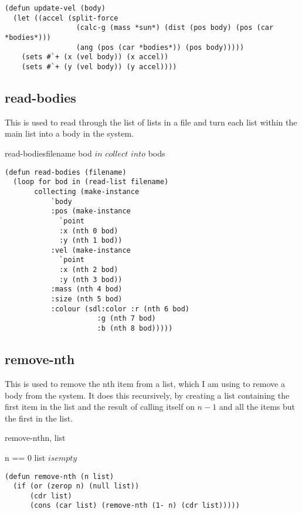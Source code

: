 \begin{lstlisting}
(defun update-vel (body)
  (let ((accel (split-force 
                 (calc-g (mass *sun*) (dist (pos body) (pos (car *bodies*)))
                 (ang (pos (car *bodies*)) (pos body)))))
    (sets #`+ (x (vel body)) (x accel))
    (sets #`+ (y (vel body)) (y accel))))
\end{lstlisting}

\subsection{read-bodies}
This is used to read through the list of lists in a file and turn each list
within the main list into a body in the system. \\
\begin{pseudocode}{read-bodies}{filename}
	\FOREACH bod $ in $ 
	\DO $collect $  $ into $ bods\\
\end{pseudocode}

\begin{lstlisting}
(defun read-bodies (filename)
  (loop for bod in (read-list filename)
       collecting (make-instance 
		   `body
		   :pos (make-instance
			 `point
			 :x (nth 0 bod)
			 :y (nth 1 bod))
		   :vel (make-instance
			 `point
			 :x (nth 2 bod)	
			 :y (nth 3 bod))
		   :mass (nth 4 bod)
		   :size (nth 5 bod)
		   :colour (sdl:color :r (nth 6 bod)
				      :g (nth 7 bod)
				      :b (nth 8 bod)))))
\end{lstlisting}

\subsection{remove-nth}
This is used to remove the nth item from a list, which I am using to remove a
body from the system. It does this recursively, by creating a list containing
the first item in the list and the result of calling itself on $n - 1$ and all
the items but the first in the list.\\

\begin{pseudocode}{remove-nth}{n, list}
	\ENDPROCEDURE

	\ENDPROCEDURE

	\ENDPROCEDURE

	\MAIN
	\IF n == 0 \OR list $ is empty$ 
	\THEN {} 
	\ELSE
	\ENDMAIN
\end{pseudocode}
\begin{lstlisting}
(defun remove-nth (n list)
  (if (or (zerop n) (null list))
      (cdr list)
      (cons (car list) (remove-nth (1- n) (cdr list)))))
\end{lstlisting}

